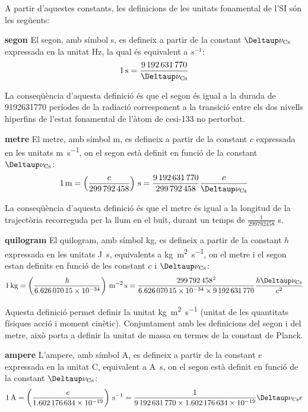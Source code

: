 A partir d'aquestes constants, les definicions de les unitats fonamental de l'SI són les següents:
\begin{list}{}
   {\setlength{\labelwidth}{22mm} \setlength{\leftmargin}{22mm} \setlength{\labelsep}{2mm}}
   \item[\textbf{segon}] El segon, amb símbol s, es defineix a partir de la constant $\Deltaup\nu\ped{Cs}$ expressada en la unitat Hz, la qual és equivalent a $\si{s^{-1}}$:
       \[
            \SI{1}{s} = \frac{\num{9192631770}}{\Deltaup\nu\ped{Cs}}
       \]

    La conseqüència d'aquesta definició és que el segon és igual a la durada de \num{9192631770} períodes de la
   radiació corresponent a la transició entre els dos nivells
  hiperfins de l'estat fonamental de l'àtom de cesi-133 no pertorbat.

   \item[\textbf{metre}]  El metre, amb símbol m, es defineix a partir de la constant $c$ expressada en les unitats \si{m.s^{-1}}, on el segon està definit en funció de la constant  $\Deltaup\nu\ped{Cs}$:
       \[
            \SI{1}{m} = \left(\frac{c}{\num{299792458}}\right)\si{\,s} = \frac{\num{9192631770}}{\num{299792458}}\frac{c}{\Deltaup\nu\ped{Cs}}
       \]

    La conseqüència d'aquesta definició és que el metre és igual a la longitud de la trajectòria recorreguda per la llum
   en el buit, durant un temps de $\frac{1}{\num{299792458}}$ s.

   \item[\textbf{quilogram}] El quilogram, amb símbol kg, es defineix a partir de la constant $h$ expressada en les unitats \si{J.s}, equivalents a \si{kg.m^2.s^{-1}}, on el metre i el segon estan definits en funció de les constant $c$ i $\Deltaup\nu\ped{Cs}$:
       \[
            \SI{1}{kg} = \left(\frac{h}{\num{6,62607015 e-34}}\right)\si{\,m^{-2}.s} = \frac{\num{299792458}^2}{\num{6,62607015 e-34}\times\num{9192631770}}\frac{h\Deltaup\nu\ped{Cs}}{c^2}
       \]

   Aquesta definició permet definir la unitat \si{kg.m^2.s^{-1}} (unitat de les quantitats físiques acció i moment cinètic). Conjuntament amb les definicions del segon i del metre, això porta a definir la unitat de massa en termes de la constant de Planck.


   \item[\textbf{ampere}] L'ampere, amb símbol A, es defineix a partir de la constant $e$ expressada en la unitat C,  equivalent a \si{A.s}, on el segon està definit en funció de la constant  $\Deltaup\nu\ped{Cs}$:
       \[
            \SI{1}{A} = \left(\frac{e}{\num{1,602176634 e-19}}\right)\si{\,s^{-1}} = \frac{1}{\num{9192631770}\times\num{1,602176634 e-19}} \Deltaup\nu\ped{Cs} e
       \]


\end{list}

